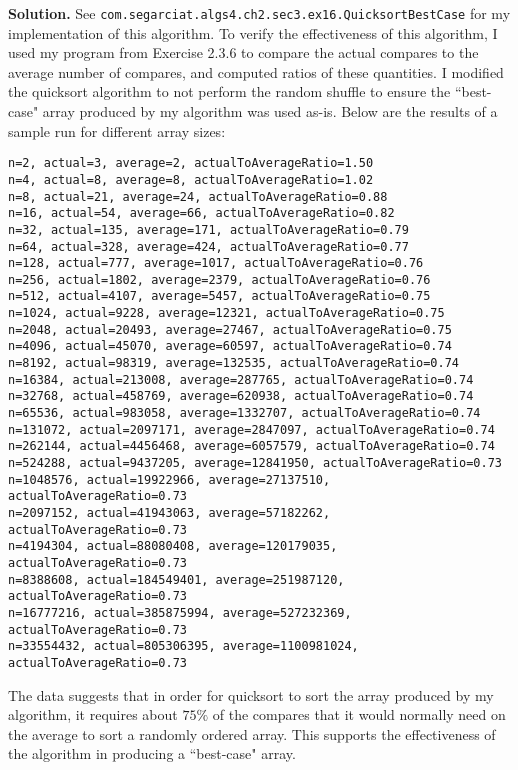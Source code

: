 \documentclass[12pt, a4paper]{article}
\newenvironment{sol}[1][Solution]
{\par\medskip\noindent \textbf{#1.} }
{\medskip}
\begin{document}
\begin{sol}
		See \texttt{com.segarciat.algs4.ch2.sec3.ex16.QuicksortBestCase} for my implementation
		of this algorithm. To verify the effectiveness of this algorithm, I used
		my program from Exercise 2.3.6 to compare the actual compares to the average
		number of compares, and computed ratios of these quantities. I modified the
		quicksort algorithm to not perform the random shuffle to ensure the ``best-case"
		array produced by my algorithm was used as-is. Below are the results of a sample
		run for different array sizes:
		\begin{lstlisting}[language={}]
n=2, actual=3, average=2, actualToAverageRatio=1.50
n=4, actual=8, average=8, actualToAverageRatio=1.02
n=8, actual=21, average=24, actualToAverageRatio=0.88
n=16, actual=54, average=66, actualToAverageRatio=0.82
n=32, actual=135, average=171, actualToAverageRatio=0.79
n=64, actual=328, average=424, actualToAverageRatio=0.77
n=128, actual=777, average=1017, actualToAverageRatio=0.76
n=256, actual=1802, average=2379, actualToAverageRatio=0.76
n=512, actual=4107, average=5457, actualToAverageRatio=0.75
n=1024, actual=9228, average=12321, actualToAverageRatio=0.75
n=2048, actual=20493, average=27467, actualToAverageRatio=0.75
n=4096, actual=45070, average=60597, actualToAverageRatio=0.74
n=8192, actual=98319, average=132535, actualToAverageRatio=0.74
n=16384, actual=213008, average=287765, actualToAverageRatio=0.74
n=32768, actual=458769, average=620938, actualToAverageRatio=0.74
n=65536, actual=983058, average=1332707, actualToAverageRatio=0.74
n=131072, actual=2097171, average=2847097, actualToAverageRatio=0.74
n=262144, actual=4456468, average=6057579, actualToAverageRatio=0.74
n=524288, actual=9437205, average=12841950, actualToAverageRatio=0.73
n=1048576, actual=19922966, average=27137510, actualToAverageRatio=0.73
n=2097152, actual=41943063, average=57182262, actualToAverageRatio=0.73
n=4194304, actual=88080408, average=120179035, actualToAverageRatio=0.73
n=8388608, actual=184549401, average=251987120, actualToAverageRatio=0.73
n=16777216, actual=385875994, average=527232369, actualToAverageRatio=0.73
n=33554432, actual=805306395, average=1100981024, actualToAverageRatio=0.73
		\end{lstlisting}
		The data suggests that in order for quicksort to sort the array produced
		by my algorithm, it requires about $75\%$ of the compares that it would
		normally need on the average to sort a randomly ordered array. This
		supports the effectiveness of the algorithm in producing a ``best-case" array.
	\end{sol}
\end{document}
